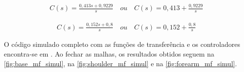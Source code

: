 \begin{equation}
  \begin{gathered}
    C(s) = \frac{0,413 s + 0,9229}{s} \quad ou \quad C(s) = 0,413 + \frac{0,9229}{s}
  \end{gathered}
  \label{eq:shoulder_ctrl}
\end{equation}

\begin{equation}
  \begin{gathered}
   C(s) = \frac{0,152s + 0,8}{s} \quad ou \quad C(s) = 0,152 + \frac{0,8}{s}
  \end{gathered}
  \label{eq:forearm_ctrl}
\end{equation}

O código simulado completo com as funções de transferência e os controladores encontra-se em \cite{lelis_hil1}.
Ao fechar as malhas, os resultados obtidos seguem na \autoref{fig:base_mf_simul}, na \autoref{fig:shoulder_mf_simul} e na
\autoref{fig:forearm_mf_simul}.

